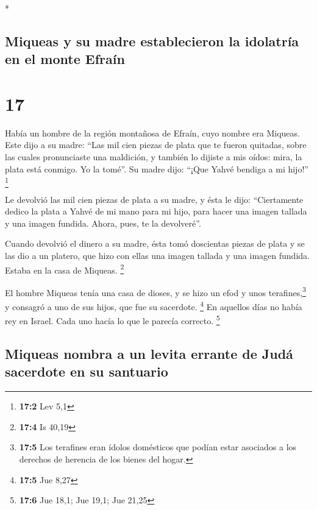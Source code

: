 \begin{paracol}{2}
\begin{otherlanguage}{english}
\end{otherlanguage}

\switchcolumn[0]*

\hypertarget{miqueas-y-su-madre-establecieron-la-idolatruxeda-en-el-monte-efrauxedn}{%
\subsection{Miqueas y su madre establecieron la idolatría en el monte
Efraín}\label{miqueas-y-su-madre-establecieron-la-idolatruxeda-en-el-monte-efrauxedn}}

\hypertarget{section-32}{%
\section{17}\label{section-32}}

 Había un hombre de la región montañosa de Efraín, cuyo
nombre era Miqueas.  Este dijo a su madre: ``Las mil cien
piezas de plata que te fueron quitadas, sobre las cuales pronunciaste
una maldición, y también lo dijiste a mis oídos: mira, la plata está
conmigo. Yo la tomé''. Su madre dijo: ``¡Que Yahvé bendiga a mi hijo!''
\footnote{\textbf{17:2} Lev 5,1}

 Le devolvió las mil cien piezas de plata a su madre, y
ésta le dijo: ``Ciertamente dedico la plata a Yahvé de mi mano para mi
hijo, para hacer una imagen tallada y una imagen fundida. Ahora, pues,
te la devolveré''.

 Cuando devolvió el dinero a su madre, ésta tomó
doscientas piezas de plata y se las dio a un platero, que hizo con ellas
una imagen tallada y una imagen fundida. Estaba en la casa de Miqueas.
\footnote{\textbf{17:4} Is 40,19}

 El hombre Miqueas tenía una casa de dioses, y se hizo un
efod y unos terafines,\footnote{\textbf{17:5} Los terafines eran ídolos
  domésticos que podían estar asociados a los derechos de herencia de
  los bienes del hogar.} y consagró a uno de sus hijos, que fue su
sacerdote. \footnote{\textbf{17:5} Jue 8,27}  En aquellos
días no había rey en Israel. Cada uno hacía lo que le parecía correcto.
\footnote{\textbf{17:6} Jue 18,1; Jue 19,1; Jue 21,25}

\hypertarget{miqueas-nombra-a-un-levita-errante-de-juduxe1-sacerdote-en-su-santuario}{%
\subsection{Miqueas nombra a un levita errante de Judá sacerdote en su
santuario}\label{miqueas-nombra-a-un-levita-errante-de-juduxe1-sacerdote-en-su-santuario}}


\end{paracol}
